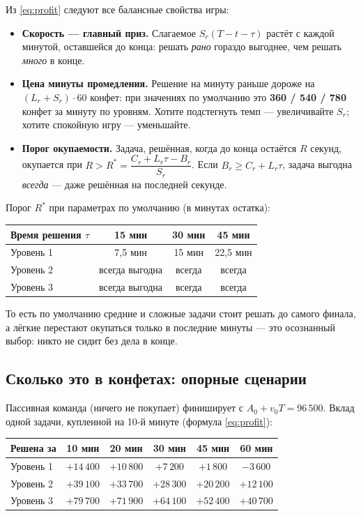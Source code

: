 \documentclass[12pt,a4paper]{article}
\newcommand{\A}{A_0}
\newcommand{\vv}{v_0}
\begin{document}
Из \eqref{eq:profit} следуют все балансные свойства игры:

\begin{itemize}[itemsep=2pt]
\item \textbf{Скорость --- главный приз.} Слагаемое $S_r(T{-}t{-}\tau)$
растёт с каждой минутой, оставшейся до конца: решать \emph{рано} гораздо
выгоднее, чем решать \emph{много} в конце.
\item \textbf{Цена минуты промедления.} Решение на минуту раньше дороже
на $(L_r + S_r)\cdot 60$ конфет: при значениях по умолчанию это
\textbf{360 / 540 / 780} конфет за минуту по уровням. Хотите подстегнуть
темп --- увеличивайте $S_r$; хотите спокойную игру --- уменьшайте.
\item \textbf{Порог окупаемости.} Задача, решённая, когда до конца
остаётся $R$ секунд, окупается при
$R > R^{*} = \dfrac{C_r + L_r\tau - B_r}{S_r}$.
Если $B_r \ge C_r + L_r\tau$, задача выгодна \emph{всегда} --- даже
решённая на последней секунде.
\end{itemize}

Порог $R^{*}$ при параметрах по умолчанию (в минутах остатка):

\begin{center}
\begin{tabular}{lccc}
\toprule
Время решения $\tau$ & 15 мин & 30 мин & 45 мин \\
\midrule
Уровень 1 & 7{,}5 мин & 15 мин & 22{,}5 мин \\
Уровень 2 & всегда выгодна & всегда & всегда \\
Уровень 3 & всегда выгодна & всегда & всегда \\
\bottomrule
\end{tabular}
\end{center}

То есть по умолчанию средние и сложные задачи стоит решать до самого
финала, а лёгкие перестают окупаться только в последние минуты ---
это осознанный выбор: никто не сидит без дела в конце.

\subsection{Сколько это в конфетах: опорные сценарии}

Пассивная команда (ничего не покупает) финиширует с
$\A + \vv T = 96\,500$. Вклад одной задачи, купленной на 10-й минуте
(формула \eqref{eq:profit}):

\begin{center}
\begin{tabular}{lccccc}
\toprule
Решена за & 10 мин & 20 мин & 30 мин & 45 мин & 60 мин \\
\midrule
Уровень 1 & $+14\,400$ & $+10\,800$ & $+7\,200$ & $+1\,800$ & $-3\,600$ \\
Уровень 2 & $+39\,100$ & $+33\,700$ & $+28\,300$ & $+20\,200$ & $+12\,100$ \\
Уровень 3 & $+79\,700$ & $+71\,900$ & $+64\,100$ & $+52\,400$ & $+40\,700$ \\
\bottomrule
\end{tabular}
\end{center}
\end{document}

